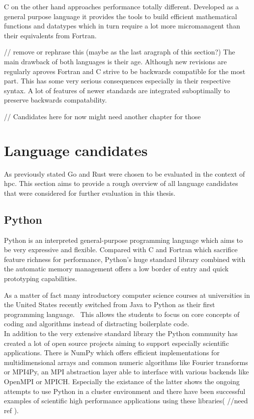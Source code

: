 C on the other hand approaches performance totally different. Developed as a general purpose language it provides the tools to build efficient mathematical functions and datatypes which in turn require a lot more micromanagent than their equivalents from Fortran.


// remove or rephrase this (maybe as the last aragraph of this section?)
The main drawback of both languages is their age. Although new revisions are regularly aproves Fortran and C strive to be backwards compatible for the most part. This has some very serious consequences especially in their respective syntax. A lot of features of newer standards are integrated suboptimally to preserve backwards compatability.


// Candidates here for now might need another chapter for those
\section{Language candidates}
\label{sec:State_of_the_art::Candidates}

As previously stated Go and Rust were chosen to be evaluated in the context of \gls{hpc}. This section aims to provide a rough overview of all language candidates that were considered for further evaluation in this thesis.

\subsection*{Python}
\label{subsec:State_of_the_art::Candidates::Python}

Python is an interpreted general-purpose programming language which aims to be very expressive and flexible. Compared with C and Fortran which sacrifice feature richness for performance, Python's huge standard library combined with the automatic memory management offers a low border of entry and quick prototyping capabilities.

As a matter of fact many introductory computer science courses at universities in the United States recently switched from Java to Python as their first programming language.~\cite{GUO14, intro_py} This allows the students to focus on core concepts of coding and algorithms instead of distracting boilerplate code.
\\


In addition to the very extensive standard library the Python community has created a lot of open source projects aiming to support especially scientific applications. There is NumPy which offers efficient implementations for multidimensional arrays and common numeric algorithms like Fourier transforms or MPI4Py, an \gls{MPI} abstraction layer able to interface with various backends like OpenMPI or MPICH. Especially the existance of the latter shows the ongoing attempts to use Python in a cluster environment and there have been successful examples of scientific high performance applications using these libraries( //need ref ).

